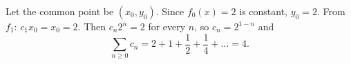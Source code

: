 Let the common point be $(x_0,y_0)$. Since $f_0(x)=2$ is constant, $y_0=2$. From $f_1$: $c_1x_0=x_0=2$. Then $c_n2^n=2$ for every $n$, so $c_n=2^{1-n}$ and
\[\sum_{n\ge0}c_n=2+1+\dfrac12+\dfrac14+\dots=\boxed{4}.\]
